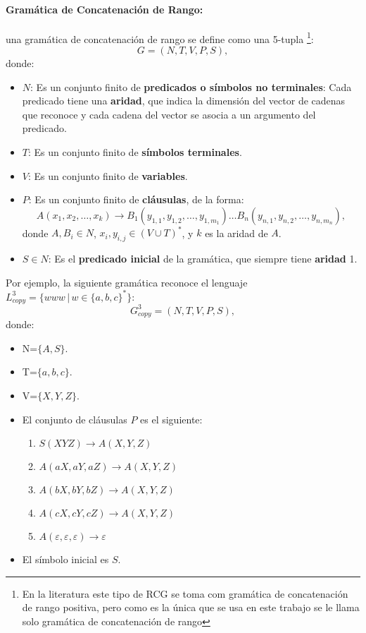\documentclass[12pt]{article}
\begin{document}
\paragraph{Gramática de Concatenación de Rango:} una gramática de concatenación de rango se define como una 5-tupla
\footnote{En la literatura este tipo de RCG se toma com gramática de concatenación de rango positiva, pero como es la única que
    se usa en este trabajo se le llama solo gramática de concatenación de rango}:
\[
    G = (N, T, V, P, S),
\]
donde:

\begin{itemize}
    \item $N$: Es un conjunto finito de \textbf{predicados o símbolos no terminales}: Cada predicado tiene una \textbf{aridad}, que indica la dimensión del vector de cadenas que reconoce y cada cadena del vector se asocia a un argumento del predicado.
    \item $T$: Es un conjunto finito de \textbf{símbolos terminales}.
    \item $V$: Es un conjunto finito de \textbf{variables}.
    \item $P$: Es un conjunto finito de \textbf{cláusulas}, de la forma:
          \[
              A(x_1, x_2, \ldots, x_k) \to B_1(y_{1,1}, y_{1,2}, \ldots, y_{1,m_1}) \ldots B_n(y_{n,1}, y_{n,2}, \ldots, y_{n,m_n}),
          \]
          donde $A, B_i \in N$, $x_i, y_{i,j} \in (V \cup T)^*$, y $k$ es la aridad de $A$.
    \item $S \in N$: Es el \textbf{predicado inicial} de la gramática, que siempre tiene \textbf{aridad} 1.
\end{itemize}

Por ejemplo, la siguiente gramática reconoce el lenguaje $L^3_{copy}=\{www\,|\,w\in \{a,b,c\}^*\}$:
\label{g_3copy}
\[
    G^3_{copy} = (N, T, V, P, S),
\]
donde:

\begin{itemize}
    \item  N=$\{A,S\}$.
    \item T=$\{a,b,c\}$.
    \item V=$\{X,Y,Z\}$.
    \item El conjunto de cláusulas $P$ es el siguiente:
          \begin{enumerate}
              \item $S(XYZ)\to A(X,Y,Z)$
              \item $A(aX,aY,aZ)\to A(X,Y,Z)$
              \item $A(bX,bY,bZ)\to A(X,Y,Z)$
              \item $A(cX,cY,cZ)\to A(X,Y,Z)$
              \item $A(\varepsilon,\varepsilon,\varepsilon)\to \varepsilon$
          \end{enumerate}
    \item El símbolo inicial es $S$.
\end{itemize}
\end{document}
